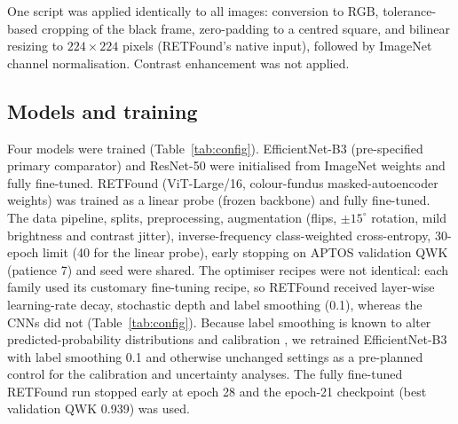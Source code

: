 \documentclass[pdflatex,sn-basic,Numbered]{sn-jnl}
\begin{document}
One script was applied identically to all images: conversion to RGB, tolerance-based cropping of the black frame, zero-padding to a centred square, and bilinear resizing to $224\times224$ pixels (RETFound's native input), followed by ImageNet channel normalisation. Contrast enhancement was not applied.

\subsection{Models and training}\label{sec:models}

Four models were trained (Table~\ref{tab:config}). EfficientNet-B3 \cite{tan2019efficientnet} (pre-specified primary comparator) and ResNet-50 \cite{he2016resnet} were initialised from ImageNet weights and fully fine-tuned. RETFound \cite{zhou2023retfound} (ViT-Large/16, colour-fundus masked-autoencoder weights) was trained as a linear probe (frozen backbone) and fully fine-tuned. The data pipeline, splits, preprocessing, augmentation (flips, $\pm15^\circ$ rotation, mild brightness and contrast jitter), inverse-frequency class-weighted cross-entropy, 30-epoch limit (40 for the linear probe), early stopping on APTOS validation QWK (patience 7) and seed were shared. The optimiser recipes were not identical: each family used its customary fine-tuning recipe, so RETFound received layer-wise learning-rate decay, stochastic depth and label smoothing (0.1), whereas the CNNs did not (Table~\ref{tab:config}). Because label smoothing is known to alter predicted-probability distributions and calibration \cite{muller2019labelsmoothing}, we retrained EfficientNet-B3 with label smoothing 0.1 and otherwise unchanged settings as a pre-planned control for the calibration and uncertainty analyses. The fully fine-tuned RETFound run stopped early at epoch 28 and the epoch-21 checkpoint (best validation QWK 0.939) was used.
\end{document}
